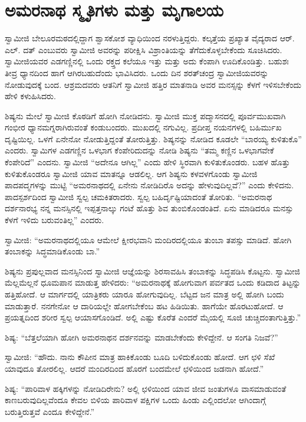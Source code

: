 
\chapter{ಅಮರನಾಥ ಸ್ಮೃತಿಗಳು ಮತ್ತು ಮೃಗಾಲಯ }

 ಸ್ವಾಮೀಜಿ ಬೇಲೂರಮಠದಲ್ಲಿದ್ದಾಗ ಶ್ವಾಸಕೋಶ ವ್ಯಾಧಿಯಿಂದ ನರಳುತ್ತಿದ್ದರು. ಕಲ್ಕತ್ತೆಯ ಪ್ರಖ್ಯಾತ ವೈದ್ಯರಾದ ಆರ್. ಎಲ್. ದತ್ ಎಂಬುವರು ಸ್ವಾಮೀಜಿ ಅವರನ್ನು ಪರೀಕ್ಷಿಸಿ ವಿಶ್ರಾಂತಿಯನ್ನು ತೆಗೆದುಕೊಳ್ಳಬೇಕೆಂದು ಸೂಚಿಸಿದರು. ಸ್ವಾಮೀಜಿಯವರ ಎಡಗಣ್ಣಿನಲ್ಲಿ ಒಂದು ರಕ್ತ್ತದ ಕಲೆಯೂ ಇತ್ತು ಮತ್ತು ಅದು ಕೆಂಪಾಗಿ ಊದಿಕೊಂಡಿತ್ತು. ಬಹುಶಃ ತೀವ್ರ ಧ್ಯಾನದಿಂದ ಹಾಗೆ ಆಗಿರಬಹುದೆಂದು ಭಾವಿಸಿದರು. ಒಂದು ದಿನ ಶರತ್‍ಚಂದ್ರ ಸ್ವಾಮೀಜಿಯವರನ್ನು ನೋಡುವುದಕ್ಕೆ ಬಂದ. ಆಶ್ರಮದವರು ಆತನಿಗೆ ಸ್ವಾಮೀಜಿ ಹತ್ತಿರ ಮಾತನಾಡಿ ಅವರ ಮನಸ್ಸನ್ನು ಕೆಳಗೆ ಇಳಿಸಬೇಕೆಂದು ಹೇಳಿ ಕಳುಹಿಸಿದರು. 

 ಶಿಷ್ಯನು ಮೇಲೆ ಸ್ವಾಮೀಜಿ ಕೊಠಡಿಗೆ ಹೋಗಿ ನೋಡಿದನು. ಸ್ವಾಮೀಜಿ ಮುಕ್ತ ಪದ್ಮಾಸನದಲ್ಲಿ ಪೂರ್ವಮುಖವಾಗಿ ಗಂಭೀರ ಧ್ಯಾನಮಗ್ನರಾಗಿರುವಂತೆ ಕಂಡುಬಂದರು. ಮುಖದಲ್ಲಿ ನಗುವಿಲ್ಲ. ಪ್ರದೀಪ್ತ ನಯನಗಳಲ್ಲಿ ಬಹಿರ್ಮುಖ ದೃಷ್ಟಿಯಿಲ್ಲ. ಒಳಗೆ ಏನೇನೋ ನೋಡುತ್ತಿದ್ದಂತೆ ತೋರುತ್ತಿತ್ತು. ಶಿಷ್ಯನನ್ನು ನೋಡಿದ ಕೂಡಲೇ “ಬಾರಯ್ಯ ಕುಳಿತುಕೊ” ಎಂದರು. ಸ್ವಾಮಿಗಳ ಎಡಗಣ್ಣಿನ ಒಳಭಾಗ ಕೆಂಪೇರಿದುದನ್ನು ನೋಡಿ ಶಿಷ್ಯನು “ತಮ್ಮ ಕಣ್ಣಿನ ಒಳಭಾಗವೇಕೆ ಕೆಂಪೇರಿದೆ” ಎಂದನು. ಸ್ವಾಮೀಜಿ “ಅದೇನೂ ಆಗಿಲ್ಲ” ಎಂದು ಹೇಳಿ ಸ್ಥಿರವಾಗಿ ಕುಳಿತುಕೊಂಡರು. ಬಹಳ ಹೊತ್ತು ಕುಳಿತುಕೊಂಡರೂ ಸ್ವಾಮೀಜಿ ಯಾವ ಮಾತನ್ನೂ ಆಡಲಿಲ್ಲ. ಆಗ ಶಿಷ್ಯನು ಕಳವಳಗೊಂಡು ಸ್ವಾಮೀಜಿ ಪಾದಪದ್ಮಗಳನ್ನು ಮುಟ್ಟಿ “ಅಮರನಾಥದಲ್ಲಿ ಏನೇನು ನೋಡಿದಿರೊ ಅದನ್ನು ಹೇಳುವುದಿಲ್ಲವೆ?” ಎಂದು ಕೇಳಿದನು. ಪಾದಸ್ಪರ್ಶದಿಂದ ಸ್ವಾಮೀಜಿ ಸ್ವಲ್ಪ ಚಮಕಿತರಾದರು. ಸ್ವಲ್ಪ ಬಹಿರ್ದೃಷ್ಟಿಯಾದಂತೆ ತೋರಿತು. “ಅಮರನಾಥ ದರ್ಶನಾರಭ್ಯ ನನ್ನ ಮನಸ್ಸಿನಲ್ಲಿ ಇಪ್ಪತ್ತನಾಲ್ಕು ಗಂಟೆ ಹೊತ್ತು ಶಿವ ತುಂಬಿಕೊಂಡಂತಿದೆ. ಏನು ಮಾಡಿದರೂ ಮನಸ್ಸು ಕೆಳಗೆ ಇಳಿದು ಬರುವಂತಿಲ್ಲ” ಎಂದರು. 

 ಸ್ವಾಮೀಜಿ: “ಅಮರನಾಥದಲ್ಲಿಯೂ ಆಮೇಲೆ ಕ್ಷೀರಭವಾನಿ ಮಂದಿರದಲ್ಲಿಯೂ ತುಂಬಾ ತಪಸ್ಸು ಮಾಡಿದೆ. ಹೋಗಿ ತಂಬಾಕನ್ನು ಸಿದ್ಧಮಾಡಿಕೊಂಡು ಬಾ.” 

 ಶಿಷ್ಯನು ಪ್ರಪುಲ್ಲವಾದ ಮನಸ್ಸಿನಿಂದ ಸ್ವಾಮೀಜಿ ಆಜ್ಞೆಯನ್ನು ಶಿರಸಾವಹಿಸಿ ತಂಬಾಕನ್ನು ಸಿದ್ಧಪಡಿಸಿ ಕೊಟ್ಟನು. ಸ್ವಾಮೀಜಿ ಮೆಲ್ಲಮೆಲ್ಲನೆ ಧೂಮಪಾನ ಮಾಡುತ್ತ ಹೇಳಿದರು: “ಅಮರನಾಥಕ್ಕೆ ಹೋಗುವಾಗ ಪರ್ವತದ ಒಂದು ಕಡಿದಾದ ತಿಟ್ಟನ್ನು ಹತ್ತಿಹೋದೆ. ಆ ಮಾರ್ಗದಲ್ಲಿ ಯಾತ್ರಿಕರು ಯಾರೂ ಹೋಗುವುದಿಲ್ಲ. ಬೆಟ್ಟದ ಜನ ಮಾತ್ರ ಅಲ್ಲಿ ಹೋಗಿ ಬಂದು ಮಾಡುತ್ತಾರೆ. ನನಗೇನೋ ಆ ದಾರಿಯಲ್ಲೇ ಹೋಗಬೇಕೆಂಬ ಹಟ ಹಿಡಿಯಿತು. ಹಾಗೆಯೇ ಹೊರಟುಹೋದೆ. ಆ ಪ್ರಯತ್ನದಿಂದ ಶರೀರ ಸ್ವಲ್ಪ ಆಯಾಸಗೊಂಡಿದೆ. ಅಲ್ಲಿ ಎಷ್ಟು ಕೊರೆತ ಎಂದರೆ ಮೈಯಲ್ಲಿ ಸೂಜಿ ಚುಚ್ಚಿದಂತಾಗುತ್ತಿತ್ತು.” 

 ಶಿಷ್ಯ: “ಬೆತ್ತಲೆಯಾಗಿ ಹೋಗಿ ಅಮರನಾಥನ ದರ್ಶನವನ್ನು ಮಾಡಬೇಕೆಂದು ಕೇಳಿದ್ದೇನೆ. ಆ ಸಂಗತಿ ನಿಜವೆ?” 

 ಸ್ವಾಮೀಜಿ: “ಹೌದು. ನಾನು ಕೌಪೀನ ಮಾತ್ರ ಹಾಕಿಕೊಂಡು ಬೂದಿ ಬಳಿದುಕೊಂಡು ಹೋದೆ. ಆಗ ಛಳಿ ಸೆಖೆ ಯಾವುದೂ ತೋರಲಿಲ್ಲ. ಆದರೆ ಮಂದಿರದಿಂದ ಹೊರಗೆ ಬಂದಮೇಲೆ ಛಳಿಯಿಂದ ಜಡನಾಗಿ ಹೋದೆ.” 

 ಶಿಷ್ಯ: “ಪಾರಿವಾಳ ಹಕ್ಕಿಗಳನ್ನು ನೋಡಿದಿರೇನು? ಅಲ್ಲಿ ಛಳಿಯಿಂದ ಯಾವ ಜೀವ ಜಂತುಗಳೂ ವಾಸಮಾಡುವಂತೆ ಕಾಣಬರುವುದಿಲ್ಲವೆಂದೂ ಕೇವಲ ಬಿಳಿಯ ಪಾರಿವಾಳ ಪಕ್ಷಿಗಳ ಒಂದು ಹಿಂಡು ಎಲ್ಲಿಂದಲೋ ಆಗಿಂದಾಗ್ಗೆ ಬರುತ್ತಿರುತ್ತವೆ ಎಂದೂ ಕೇಳಿದ್ದೇನೆ.” 

